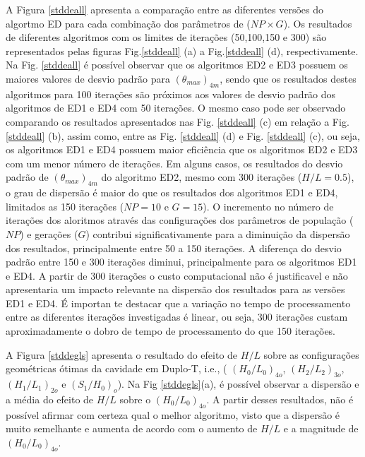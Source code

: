 \documentclass[12pt,A4,A4pt]{article}
\begin{document}
A Figura \ref{stddeall} apresenta a comparação entre as diferentes versões do algortmo ED para cada combinação dos parâmetros de  ($NP \times G$). Os resultados de diferentes algoritmos com os limites de iterações (50,100,150 e 300) são representados pelas figuras Fig.\ref{stddeall} (a) a Fig.\ref{stddeall} (d), respectivamente. Na Fig. \ref{stddeall} é possível observar que os algoritmos ED2 e ED3 possuem os maiores valores de desvio padrão para $({\theta}_{max})_{4m}$, sendo que os resultados destes algoritmos para 100 iterações são próximos aos valores de desvio padrão dos algoritmos de ED1 e ED4 com 50 iterações. O mesmo caso pode ser observado comparando os resultados apresentados nas Fig. \ref{stddeall} (c) em relação a Fig. \ref{stddeall} (b), assim como, entre as Fig. \ref{stddeall} (d) e Fig. \ref{stddeall} (c), ou seja, os algoritmos ED1 e ED4 possuem maior eficiência que os algoritmos ED2 e ED3 com um menor número de iterações. Em alguns casos, os resultados do desvio padrão de $({\theta}_{max})_{4m}$ do algoritmo ED2, mesmo com 300 iterações ($H/L=0.5$), o grau de dispersão é maior do que os resultados dos algoritmos ED1 e ED4, limitados as 150 iterações ($NP=10$ e $G=15$). O incremento no número de iterações dos aloritmos através das configurações dos parâmetros de população ($NP$) e gerações ($G$) contribui significativamente para a diminuição da dispersão dos resultados, principalmente entre 50 a 150 iterações. A diferença do desvio padrão entre 150 e 300 iterações diminui, principalmente para os algoritmos ED1 e ED4. A partir de 300 iterações o custo computacional não é justificavel e não apresentaria um impacto relevante na dispersão dos resultados para as versões ED1 e ED4. É importan 
te destacar que a variação no tempo de processamento entre as diferentes iterações investigadas é linear, ou seja, 300 iterações custam aproximadamente o dobro de tempo de processamento do que 150 iterações.


\hspace{0.5cm} A Figura \ref{stddegls} apresenta o resultado do efeito de $H/L$ sobre as configurações geométricas ótimas da cavidade em Duplo-T, i.e., ( ${(H_{0}/L_{0})_{4o}}$,  ${(H_{2}/L_{2})_{3o}}$, ${(H_{1}/L_{1})_{2o}}$ e ${(S_{1}/H_{0})_{o}}$). Na Fig \ref{stddegls}(a), é possível observar a dispersão e a média do efeito de  $H/L$ sobre o ${(H_{0}/L_{0})_{4o}}$. A partir desses resultados, não é possível afirmar com certeza qual o melhor algoritmo, visto que a dispersão é muito semelhante e aumenta de acordo com o aumento de $H/L$ e a magnitude de ${(H_{0}/L_{0})_{4o}}$.
\end{document}
